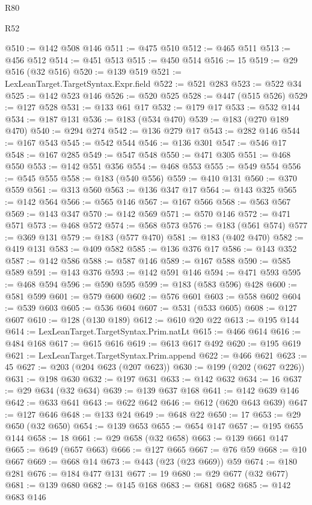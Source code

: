 \begin{lexlean}{R80}
\begin{lexlean}{R52}
\begin{coremodule}
{{{{{{{{{{{{{{{{{{{{{{{{{{{{{{{{{{{{{{{{{{{{{{{{{{{{{{{{{{{{{{{{{{{{{{{{{{{{{{{{{{{{{{{{{{{{{{{{{{{{{{{{{{{{{{{{{{{{{{{{{{{{{{{{{{{{{{{{{{{{{{{{{{{{{{{{{{{{{{{{{{{{{{{{{{{{{{{{{{{{{{{{{{{{{{{{{{{{{{@510 := @142 @508 @146
@511 := @475 @510
@512 := @465 @511
@513 := @456 @512
@514 := @451 @513
@515 := @450 @514
@516 := 15
@519 := @29 @516 (@32 @516)
@520 := @139 @519
@521 := LexLeanTarget.TargetSyntax.Expr.field
@522 := @521 @283
@523 := @522 @34
@525 := @142 @523 @146
@526 := @520 @525
@528 := @447 (@515 @526)
@529 := @127 @528
@531 := @133 @61 @17
@532 := @179 @17
@533 := @532 @144
@534 := @187 @131
@536 := @183 (@534 @470)
@539 := @183 (@270 @189 @470)
@540 := @294 @274
@542 := @136 @279 @17
@543 := @282 @146
@544 := @167 @543
@545 := @542 @544
@546 := @136 @301
@547 := @546 @17
@548 := @167 @285
@549 := @547 @548
@550 := @471 @305
@551 := @468 @550
@553 := @142 @551 @356
@554 := @468 @553
@555 := @549 @554
@556 := @545 @555
@558 := @183 (@540 @556)
@559 := @410 @131
@560 := @370 @559
@561 := @313 @560
@563 := @136 @347 @17
@564 := @143 @325
@565 := @142 @564
@566 := @565 @146
@567 := @167 @566
@568 := @563 @567
@569 := @143 @347
@570 := @142 @569
@571 := @570 @146
@572 := @471 @571
@573 := @468 @572
@574 := @568 @573
@576 := @183 (@561 @574)
@577 := @369 @131
@579 := @183 (@577 @470)
@581 := @183 (@402 @470)
@582 := @419 @131
@583 := @409 @582
@585 := @136 @376 @17
@586 := @143 @352
@587 := @142 @586
@588 := @587 @146
@589 := @167 @588
@590 := @585 @589
@591 := @143 @376
@593 := @142 @591 @146
@594 := @471 @593
@595 := @468 @594
@596 := @590 @595
@599 := @183 (@583 @596) @428
@600 := @581 @599
@601 := @579 @600
@602 := @576 @601
@603 := @558 @602
@604 := @539 @603
@605 := @536 @604
@607 := @531 (@533 @605)
@608 := @127 @607
@610 := @128 (@130 @189)
@612 := @610 @20 @22
@613 := @195 @144
@614 := LexLeanTarget.TargetSyntax.Prim.natLt
@615 := @466 @614
@616 := @484 @168
@617 := @615 @616
@619 := @613 @617 @492
@620 := @195 @619
@621 := LexLeanTarget.TargetSyntax.Prim.append
@622 := @466 @621
@623 := 45
@627 := @203 (@204 @623 (@207 @623))
@630 := @199 (@202 (@627 @226))
@631 := @198 @630
@632 := @197 @631
@633 := @142 @632
@634 := 16
@637 := @29 @634 (@32 @634)
@639 := @139 @637 @168
@641 := @142 @639 @146
@642 := @633 @641
@643 := @622 @642
@646 := @612 (@620 @643 @639)
@647 := @127 @646
@648 := @133 @24
@649 := @648 @22
@650 := 17
@653 := @29 @650 (@32 @650)
@654 := @139 @653
@655 := @654 @147
@657 := @195 @655 @144
@658 := 18
@661 := @29 @658 (@32 @658)
@663 := @139 @661 @147
@665 := @649 (@657 @663)
@666 := @127 @665
@667 := @76 @59
@668 := @10 @667
@669 := @668 @14
@673 := @443 (@23 (@23 @669)) @59
@674 := @180 @281
@676 := @184 @477 @131
@677 := 19
@680 := @29 @677 (@32 @677)
@681 := @139 @680
@682 := @145 @168
@683 := @681 @682
@685 := @142 @683 @146
}}}}}}}}}}}}}}}}}}}}}}}}}}}}}}}}}}}}}}}}}}}}}}}}}}}}}}}}}}}}}}}}}}}}}}}}}}}}}}}}}}}}}}}}}}}}}}}}}}}}}}}}}}}}}}}}}}}}}}}}}}}}}}}}}}}}}}}}}}}}}}}}}}}}}}}}}}}}}}}}}}}}}}}}}}}}}}}}}}}}}}}}}}}}}}}}}}}}}}
\end{coremodule}
\end{lexlean}
\end{lexlean}
